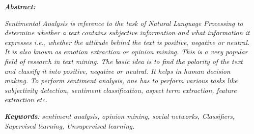 \documentclass[12pt]{article}
\begin{document}
\begin{justify}
{\fontsize{14pt}{16.8pt}\selectfont \textbf{\textit{Abstract:}}\par}
\end{justify}\par

\begin{justify}
\textit{\textcolor[HTML]{00000A}{Sentimental Analysis is reference to the task of Natural Language Processing to determine whether a text contains subjective information and what information it expresses i.e., whether the attitude behind the text is positive, negative or neutral. It is also known as emotion extraction or opinion mining. This is a very popular field of research in text mining. The basic idea is to find the polarity of the text and classify it into positive, negative or neutral. It helps in human decision making. To perform sentiment analysis, one has to perform various tasks like subjectivity detection, sentiment classification, aspect term extraction, feature extraction etc.}}
\end{justify}\par


\vspace{\baselineskip}
\begin{justify}
{\fontsize{14pt}{16.8pt}\selectfont \textbf{\textit{Keywords}}\textit{:} \textit{\textcolor[HTML]{00000A}{sentiment analysis, opinion mining, social networks, Classifiers, Supervised learning, Unsupervised learning.}}\par}
\end{justify}\par


\vspace{\baselineskip}
\begin{justify}
\textit{\textcolor[HTML]{00000A}{ }}


\newpage

\end{justify}\par


\vspace{\baselineskip}

\frontmatter
{}
\rfoot{\thepage}
\begin{justify}
 
\end{justify}\par
\end{document}
